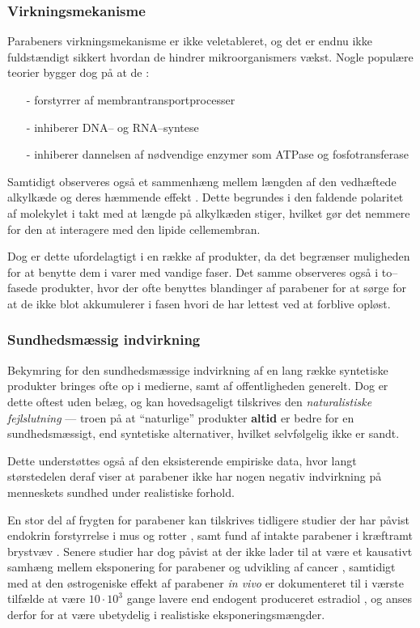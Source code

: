     \subsubsection{Virkningsmekanisme}
    Parabeners virkningsmekanisme er ikke veletableret, og det er endnu ikke fuldstændigt sikkert hvordan de hindrer mikroorganismers vækst. Nogle populære teorier bygger dog på at de \parencite{Nell2001}:
    \begin{itemize}
        \item[-] forstyrrer af membrantransportprocesser
        \item[-] inhiberer DNA-- og RNA--syntese
        \item[-] inhiberer dannelsen af nødvendige enzymer som ATPase og fosfotransferase
    \end{itemize}
    Samtidigt observeres også et sammenhæng mellem længden af den vedhæftede alkylkæde og deres hæmmende effekt \parencite{Alli2005}. Dette begrundes i den faldende polaritet af molekylet i takt med at længde på alkylkæden stiger, hvilket gør det nemmere for den at interagere med den lipide cellemembran.

    Dog er dette ufordelagtigt i en række af produkter, da det begrænser muligheden for at benytte dem i varer med vandige faser. Det samme observeres også i to--fasede produkter, hvor der ofte benyttes blandinger af parabener for at sørge for at de ikke blot akkumulerer i fasen hvori de har lettest ved at forblive opløst.

    \subsubsection{Sundhedsmæssig indvirkning}
    Bekymring for den sundhedsmæssige indvirkning af en lang række syntetiske produkter bringes ofte op i medierne, samt af offentligheden generelt. Dog er dette oftest uden belæg, og kan hovedsageligt tilskrives den \textit{naturalistiske fejlslutning} --- troen på at ``naturlige'' produkter \textbf{altid} er bedre for en sundhedsmæssigt, end syntetiske alternativer, hvilket selvfølgelig ikke er sandt.

    Dette understøttes også af den eksisterende empiriske data, hvor langt størstedelen deraf viser at parabener ikke har nogen negativ indvirkning på menneskets sundhed under realistiske forhold.

    En stor del af frygten for parabener kan tilskrives tidligere studier der har påvist endokrin forstyrrelse i mus og rotter \parencite{Phil2008}, samt fund af intakte parabener i kræftramt brystvæv \parencite{Darb2004}. Senere studier har dog påvist at der ikke lader til at være et kausativt samhæng mellem eksponering for parabener og udvikling af cancer \parencite{Emil2022}, samtidigt med at den østrogeniske effekt af parabener \textit{in vivo} er dokumenteret til i værste tilfælde at være $10\cdot 10^3$ gange lavere end endogent produceret estradiol \parencite{Edwi1998}, og anses derfor for at være ubetydelig i realistiske eksponeringsmængder.

